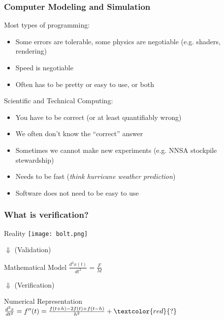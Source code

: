 \documentclass[mathserif]{beamer}
\begin{document}
\begin{frame}
  \frametitle{Computer Modeling and Simulation}

  \begin{block}{Most types of programming:}
    \begin{itemize}
    \item Some errors are tolerable, some physics are negotiable
      (e.g. shaders, rendering)
    \item Speed is negotiable
    \item Often has to be pretty or easy to use, or both
    \end{itemize}
  \end{block}

  \begin{block}{Scientific and Technical Computing:}
    \begin{itemize}
    \item You have to be correct (or at least quantifiably wrong)
    \item We often don't know the ``correct'' answer      
    \item Sometimes we cannot make new experiments (e.g. NNSA
      stockpile stewardship)
    \item Needs to be fast ({\em think hurricane weather prediction})
    \item Software does not need to be easy to use
    \end{itemize}
  \end{block}

\end{frame}


\begin{frame}
 \frametitle{What is verification?}

 \begin{center}
  \center
      \begin{block}{Reality}
       \center
       \texttt{[image: bolt.png]}\\
       \end{block}
  $\Downarrow$ (Validation)
      \begin{block}{Mathematical Model}
       \center
       $\frac{d^2x(t)}{dt^2} = \frac{F}{M}$\\
      \end{block}
  $\Downarrow$ (Verification)
  \begin{block}{Numerical Representation}
   \center
   $\frac{d^2x}{dt^2} = f''(t) = \frac{f(t+h) - 2 f(t) + f(t-h)}{h^2} + \textcolor{red}{?}$
   \end{block}
 \end{center}
\end{frame}
\end{document}
